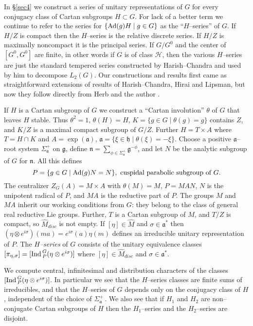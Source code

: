\documentclass{conm-p-l}
\renewcommand{\gg}{\mathfrak{g}}
\def\ga{\mathfrak{a}}
\def\gg{\mathfrak{g}}
\def\gh{\mathfrak{h}}
\def\gn{\mathfrak{n}}
\def\Ad{{\rm Ad}}
\def\Ind{{\rm Ind\,}}
\def\cH{\mathcal{H}}
\begin{document}
In \S \ref{sec4} we construct a series of unitary representations of $G$ for
every conjugacy class of Cartan subgroups $H \subset G$.  For lack of a
better term we continue to refer to the series for 
$\{\Ad(g)H \mid g \in G\}$
as the ``$H$--series'' of $G$.  If $H/Z$ is compact then the
$H$--series is the relative discrete series.  If $H/Z$ is maximally
noncompact it is the principal series.  If $G/G^0$ and the center of
$[G^0,G^0]$ are finite, in other words if $G$ is of class $\cH$,
then the various $H$--series are just the standard tempered series
constructed by Harish--Chandra and used by him to decompose $L_2(G)$.  Our
constructions and results first came as straightforward extensions
of results of Harish--Chandra, Hirai and Lipsman, but now they follow
directly from Herb and the author \cite{HW1986a}.

If $H$ is a Cartan subgroup of $G$ we construct a ``Cartan involution''
$\theta$ of $G$ that leaves $H$ stable.  Thus $\theta^2 = 1$, $\theta(H) = H$,
$K = \{g \in G \mid \theta(g) = g\}$ contains $Z$, and $K/Z$ is a maximal
compact subgroup of $G/Z$.  Further $H = T \times A$ where $T = H \cap K$ and
$A = \exp(\ga)$, $\ga = \{\xi \in \gh \mid \theta(\xi) = -\xi\}$.  
Choose a positive $\ga$--root system $\Sigma_\ga^+$ on $\gg$, define
$\gn = \sum_{\phi \in \Sigma_\ga^+} \gg^{-\phi}$, and let $N$ be the
analytic subgroup of $G$ for $\gn$.  All this defines
$$
P = \{g \in G \mid \Ad(g)N = N\}, \text{ cuspidal parabolic 
   subgroup of } G.
$$
The centralizer $Z_G(A) = M\times A$ with $\theta(M) = M$, $P = MAN$,
$N$ is the unipotent radical of $P$, and $MA$ is the reductive part of $P$.  
The groups $M$ and $MA$ inherit our working conditions from $G$: they belong
to the class of general real reductive Lie groups.  Further, $T$ is a 
Cartan subgroup of $M$, and $T/Z$ is compact, so $\widehat{M}_{disc}$ is
not empty.  If $[\eta] \in \widehat{M}$ and $\sigma \in \ga^*$ then
$(\eta\otimes e^{i\sigma})(ma) = e^{i\sigma}(a)\eta(m)$ defines an irreducible
unitary representation of $P$.  The {\em $H$--series}  of $G$ consists of
the unitary equivalence classes
$
[\pi_{\eta,\sigma}] = [\Ind_P^G(\eta \otimes e^{i\sigma})]
$ 
where $[\eta] \in \widehat{M}_{disc}$ and $\sigma \in \ga^*$.

We compute central, infinitesimal and distribution characters of the classes
$[\Ind_P^G(\eta \otimes e^{i\sigma})]$.  In particular we see that the
$H$--series classes are finite sums of irreducibles, and that the $H$--series
of $G$ depends only on the conjugacy class of $H$, independent of the
choice of $\Sigma_\ga^+$\,.  We also see that if $H_1$ and $H_2$ are
non--conjugate Cartan subgroups of $H$ then the $H_1$--series and the
$H_2$--series are disjoint.
\end{document}
